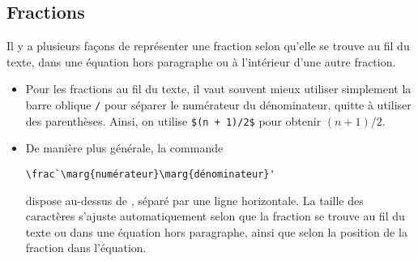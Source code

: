 \subsection{Fractions}
\label{sec:math:bases:fractions}

Il y a plusieurs façons de représenter une fraction selon qu'elle se
trouve au fil du texte, dans une équation hors paragraphe ou à
l'intérieur d'une autre fraction.
\begin{itemize}
\item Pour les fractions au fil du texte, il vaut souvent mieux
  utiliser simplement la barre oblique \verb=/= pour séparer le
  numérateur du dénominateur, quitte à utiliser des parenthèses.
  Ainsi, on utilise \verb=$(n + 1)/2$= pour obtenir $(n + 1)/2$.
\item De manière plus générale, la commande
\begin{lstlisting}
\frac`\marg{numérateur}\marg{dénominateur}'
\end{lstlisting}
  dispose  au-dessus de , séparé
  par une ligne horizontale. La taille des caractères s'ajuste
  automatiquement selon que la fraction se trouve au fil
  du texte ou dans une équation hors paragraphe, ainsi que selon la
  position de la fraction dans l'équation.
\end{itemize}
